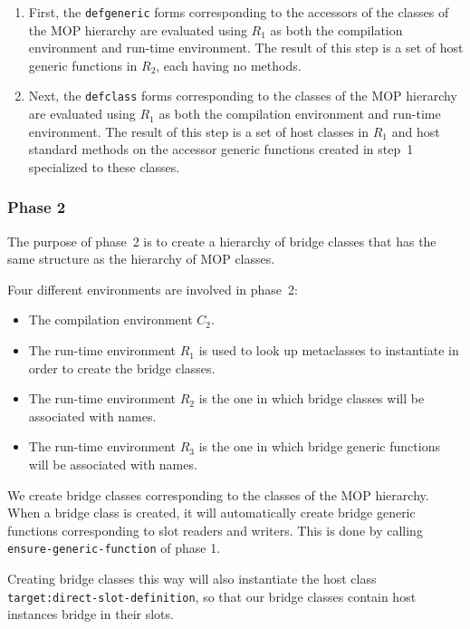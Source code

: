 \begin{enumerate}
\item First, the \texttt{defgeneric} forms corresponding to the
  accessors of the classes of the MOP hierarchy are evaluated using
  $R_1$ as both the compilation environment and run-time environment.
  The result of this step is a set of host generic functions in $R_2$,
  each having no methods.
\item Next, the \texttt{defclass} forms corresponding to the classes
  of the MOP hierarchy are evaluated using $R_1$ as both the
  compilation environment and run-time environment.  The result of
  this step is a set of host classes in $R_1$ and host standard
  methods on the accessor generic functions created in step~1
  specialized to these classes.
\end{enumerate}

\subsubsection{Phase 2}

The purpose of phase~2 is to create a hierarchy of bridge classes that
has the same structure as the hierarchy of MOP classes.

Four different environments are involved in phase~2:

\begin{itemize}
\item The compilation environment $C_2$.
\item The run-time environment $R_1$ is used to look up metaclasses to
  instantiate in order to create the bridge classes.
\item The run-time environment $R_2$ is the one in which bridge
  classes will be associated with names.
\item The run-time environment $R_3$ is the one in which bridge
  generic functions will be associated with names.
\end{itemize}

We create bridge classes corresponding to the classes of the MOP
hierarchy.  When a bridge class is created, it will automatically
create bridge generic functions corresponding to slot readers and
writers.  This is done by calling \texttt{ensure-generic-function} of
phase 1.

Creating bridge classes this way will also instantiate the host class
\texttt{target:direct-slot-definition}, so that our bridge classes
contain host instances bridge in their slots. 

